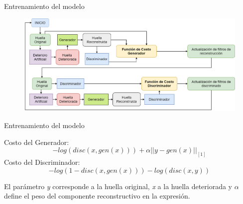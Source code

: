 \documentclass[12pt,aspectratio=169]{beamer}
\begin{document}
\begin{frame}{Entrenamiento del modelo}

    \begin{figure}
        \includegraphics[scale=0.26]{figs/training_flow_overall.png}
    \end{figure}

\end{frame}

\begin{frame}{Entrenamiento del modelo}

    Costo del Generador:
    \begin{equation}
        - log(disc(x,gen(x)))+\alpha||y-gen(x)||_{[1]}
    \end{equation}
    Costo del Discriminador:
    \begin{equation}
        -log(1-disc(x,gen(x)))-log(disc(x,y))
    \end{equation}
    
    \vspace{5mm}
    
    El parámetro \textit{y} corresponde a la huella original, \textit{x} a la huella deteriorada y $\alpha$ define el peso del componente reconstructivo en la expresión.

\end{frame}
\end{document}
